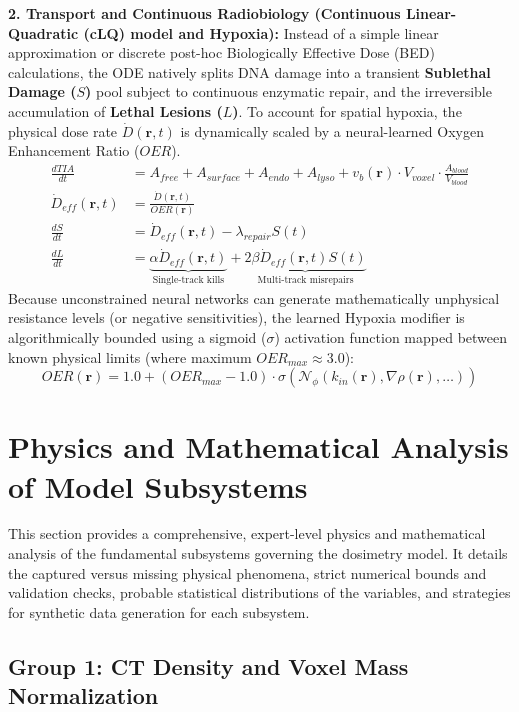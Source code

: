 \documentclass[11pt,a4paper]{article}
\begin{document}
\textbf{2. Transport and Continuous Radiobiology (Continuous Linear-Quadratic (cLQ) model and Hypoxia):}
Instead of a simple linear approximation or discrete post-hoc Biologically Effective Dose (BED) calculations, the ODE natively splits DNA damage into a transient \textbf{Sublethal Damage ($S$)} pool subject to continuous enzymatic repair, and the irreversible accumulation of \textbf{Lethal Lesions ($L$)}. To account for spatial hypoxia, the physical dose rate $\dot{D}(\mathbf{r}, t)$ is dynamically scaled by a neural-learned Oxygen Enhancement Ratio ($OER$).
\begin{align}
    \frac{dTIA}{dt} &= A_{free} + A_{surface} + A_{endo} + A_{lyso} + v_b(\mathbf{r}) \cdot V_{voxel} \cdot \frac{A_{blood}}{V_{blood}} \\
    \dot{D}_{eff}(\mathbf{r}, t) &= \frac{\dot{D}(\mathbf{r}, t)}{OER(\mathbf{r})} \\
    \frac{dS}{dt} &= \dot{D}_{eff}(\mathbf{r}, t) - \lambda_{repair} S(t) \\
    \frac{dL}{dt} &= \underbrace{\alpha \dot{D}_{eff}(\mathbf{r}, t)}_{\text{Single-track kills}} + \underbrace{2\beta \dot{D}_{eff}(\mathbf{r}, t) S(t)}_{\text{Multi-track misrepairs}}
\end{align}
Because unconstrained neural networks can generate mathematically unphysical resistance levels (or negative sensitivities), the learned Hypoxia modifier is algorithmically bounded using a sigmoid ($\sigma$) activation function mapped between known physical limits (where maximum $OER_{max} \approx 3.0$):
\begin{equation}
    OER(\mathbf{r}) = 1.0 + (OER_{max} - 1.0) \cdot \sigma\left(\mathcal{N}_\phi(k_{in}(\mathbf{r}), \nabla\rho(\mathbf{r}), \dots)\right)
\end{equation}


\section{Physics and Mathematical Analysis of Model Subsystems}

This section provides a comprehensive, expert-level physics and mathematical analysis of the fundamental subsystems governing the dosimetry model. It details the captured versus missing physical phenomena, strict numerical bounds and validation checks, probable statistical distributions of the variables, and strategies for synthetic data generation for each subsystem.

\subsection{Group 1: CT Density and Voxel Mass Normalization}
\end{document}
